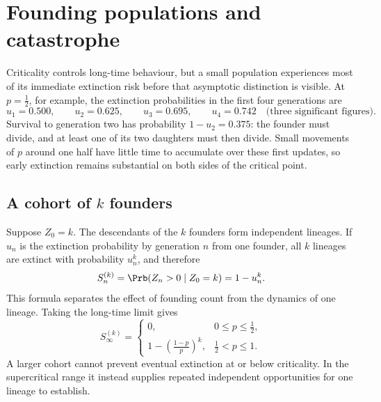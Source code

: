 \section{Founding populations and catastrophe}
\label{sec:small}

Criticality controls long-time behaviour, but a small population experiences most
of its immediate extinction risk before that asymptotic distinction is visible.
At \(p=\tfrac12\), for example, the extinction probabilities in the first four
generations are
\begin{equation}
  u_1=0.500,
  \qquad u_2=0.625,
  \qquad u_3=0.695,
  \qquad u_4=0.742
  \quad\text{(three significant figures)}.
  \label{eq:early-extinction-values}
\end{equation}
Survival to generation two has probability \(1-u_2=0.375\): the founder must
divide, and at least one of its two daughters must then divide.  Small movements
of \(p\) around one half have little time to accumulate over these first updates,
so early extinction remains substantial on both sides of the critical point.

\subsection{A cohort of \texorpdfstring{\(k\)}{k} founders}
\label{sec:cohort}

Suppose \(Z_0=k\).  The descendants of the \(k\) founders form independent
lineages.  If \(u_n\) is the extinction probability by generation \(n\) from one
founder, all \(k\) lineages are extinct with probability \(u_n^k\), and therefore
\begin{equation}
  S_n^{(k)}=\Prb(Z_n>0\mid Z_0=k)=1-u_n^k.
  \label{eq:Snk}
\end{equation}
This formula separates the effect of founding count from the dynamics of one
lineage.  Taking the long-time limit gives
\begin{equation}
  S_\infty^{(k)}=
  \begin{cases}
    0,&0\leq p\leq\tfrac12,\\[3pt]
    \displaystyle
    1-\left(\frac{1-p}{p}\right)^k,
    &\tfrac12<p\leq1.
  \end{cases}
  \label{eq:cohort-ultimate-survival}
\end{equation}
A larger cohort cannot prevent eventual extinction at or below criticality.  In
the supercritical range it instead supplies repeated independent opportunities
for one lineage to establish.

